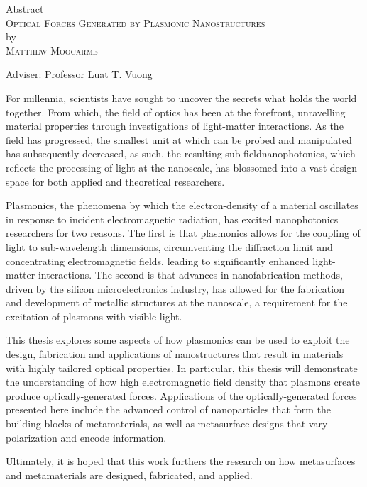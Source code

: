 \begin{center}
Abstract \\
\textsc{Optical Forces Generated by Plasmonic Nanostructures} \\
by \\
\textsc{Matthew Moocarme} \\[0.25in]
\end{center}

\vspace{0.25in}
\noindent Adviser: Professor Luat T. Vuong
\vspace{0.25in}
\noindent 

For millennia, scientists have sought to uncover the secrets what holds the world together. From which, the field of optics has been at the forefront, unravelling material properties through investigations of light-matter interactions. As the field has progressed, the smallest unit at which can be probed and manipulated has subsequently decreased, as such, the resulting sub-field\textemdash nanophotonics, which reflects the processing of light at the nanoscale, has blossomed into a vast design space for both applied and theoretical researchers.

Plasmonics, the phenomena by which the electron-density of a material oscillates in response to incident electromagnetic radiation, has excited nanophotonics researchers for two reasons. The first is that plasmonics allows for the coupling of light to sub-wavelength dimensions, circumventing the diffraction limit and concentrating electromagnetic fields, leading to significantly enhanced light-matter interactions. The second is that advances in nanofabrication methods, driven by the silicon microelectronics industry, has allowed for the fabrication and development of metallic structures at the nanoscale, a requirement for the excitation of plasmons with visible light.

This thesis explores some aspects of how plasmonics can be used to exploit the design, fabrication and applications of nanostructures that result in materials with highly tailored optical properties. In particular, this thesis will demonstrate the understanding of how high electromagnetic field density that plasmons create produce optically-generated forces. Applications of the optically-generated forces presented here include the advanced control of nanoparticles that form the building blocks of metamaterials, as well as metasurface designs that vary polarization and encode information. 

Ultimately, it is hoped that this work furthers the research on how metasurfaces and metamaterials are designed, fabricated, and applied.

